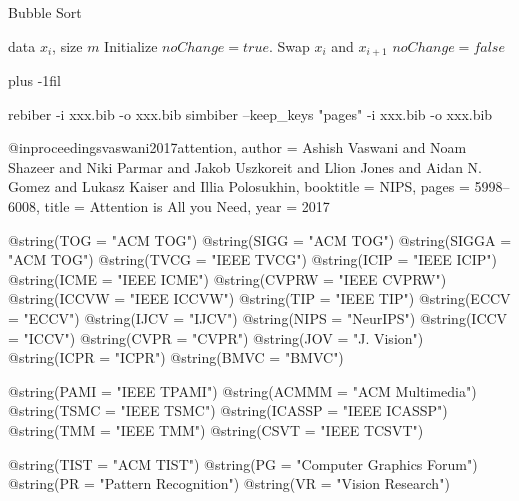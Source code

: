 \begin{algorithm}[tb]
    \caption{Bubble Sort}
    \label{alg:example}
    \begin{algorithmic}
        data $x_i$, size $m$
       \REPEAT
       \STATE Initialize $noChange = true$.
       \STATE Swap $x_i$ and $x_{i+1}$
       \STATE $noChange = false$
       \ENDIF
       \ENDFOR
    \end{algorithmic}
\end{algorithm}



\baselineskip plus -1fil

rebiber -i xxx.bib -o xxx.bib
simbiber --keep_keys "pages" -i xxx.bib -o xxx.bib

@inproceedings{vaswani2017attention,
 author = {Ashish Vaswani and Noam Shazeer and Niki Parmar and Jakob Uszkoreit and Llion Jones and Aidan N. Gomez and Lukasz Kaiser and Illia Polosukhin},
 booktitle = NIPS,
 pages = {5998--6008},
 title = {Attention is All you Need},
 year = {2017}
}

@string(TOG = "{ACM TOG}")
@string(SIGG = "{ACM TOG}")
@string(SIGGA = "{ACM TOG}")
@string(TVCG = "{IEEE TVCG}")
@string(ICIP = "{IEEE ICIP}")
@string(ICME = "{IEEE ICME}")
@string(CVPRW = "{IEEE CVPRW}")
@string(ICCVW = "{IEEE ICCVW}")
@string(TIP = "{IEEE TIP}")
@string(ECCV = "{ECCV}")
@string(IJCV = "{IJCV}")
@string(NIPS = "{NeurIPS}")
@string(ICCV = "{ICCV}")
@string(CVPR = "{CVPR}")
@string(JOV = "{J. Vision}")
@string(ICPR = "{ICPR}")
@string(BMVC =	"{BMVC}")

@string(PAMI = "{IEEE TPAMI}")
@string(ACMMM	= "{ACM Multimedia}")
@string(TSMC = "{IEEE TSMC}")
@string(ICASSP = "{IEEE ICASSP}")
@string(TMM	= "{IEEE TMM}")
@string(CSVT = "{IEEE TCSVT}")

@string(TIST = "{ACM TIST}")
@string(PG = "{Computer Graphics Forum}")
@string(PR = "{Pattern Recognition}")
@string(VR = "{Vision Research}")

